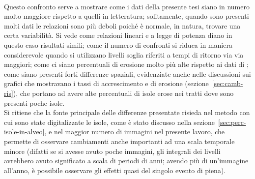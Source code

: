 %
\\
Questo confronto serve a mostrare come i dati della presente tesi siano in numero molto maggiore rispetto a quelli in letteratura; solitamente, quando sono presenti molti dati le relazioni sono più deboli poiché è normale, in natura, trovare una certa variabilità.
Si vede come relazioni lineari e a legge di potenza diano in questo caso risultati simili;
come il numero di confronti si riduca in maniera considerevole quando si utilizzano livelli soglia riferiti a tempi di ritorno via via maggiori;
come ci siano percentuali di erosione molto più alte rispetto ai dati di ;
come siano presenti forti differenze spaziali, evidenziate anche nelle discussioni sui grafici che mostravano i tassi di accrescimento e di erosione (sezione~\ref{sec:camb-ris}), che portano ad avere alte percentuali di isole erose nei tratti dove sono presenti poche isole.
\\
Si ritiene che la fonte principale delle differenze presentate risieda nel metodo con cui sono state digitalizzate le isole, come è stato discusso nella sezione~\ref{sec:perc-isole-in-alveo}, e nel maggior numero di immagini nel presente lavoro, che permette di osservare cambiamenti anche importanti ad una scala temporale minore (difatti se si avesse avuto poche immagini, gli integrali dei livelli avrebbero avuto significato a scala di periodi di anni; avendo più di un'immagine all'anno, è possibile osservare gli effetti quasi del singolo evento di piena).




